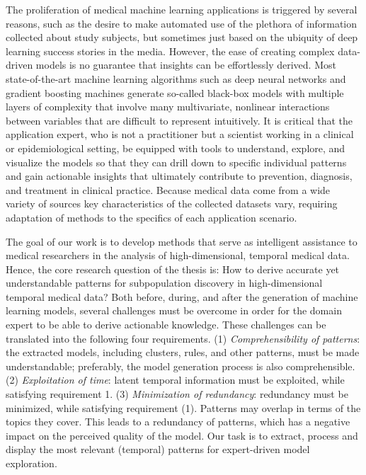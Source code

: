 \documentclass[
  oneside]{book}
\begin{document}
The proliferation of medical machine learning applications is triggered by several reasons, such as the desire to make automated use of the plethora of information collected about study subjects, but sometimes just based on the ubiquity of deep learning success stories in the media.
However, the ease of creating complex data-driven models is no guarantee that insights can be effortlessly derived.
Most state-of-the-art machine learning algorithms such as deep neural networks and gradient boosting machines generate so-called black-box models with multiple layers of complexity that involve many multivariate, nonlinear interactions between variables that are difficult to represent intuitively.
It is critical that the application expert, who is not a practitioner but a scientist working in a clinical or epidemiological setting, be equipped with tools to understand, explore, and visualize the models so that they can drill down to specific individual patterns and gain actionable insights that ultimately contribute to prevention, diagnosis, and treatment in clinical practice.
Because medical data come from a wide variety of sources key characteristics of the collected datasets vary, requiring adaptation of methods to the specifics of each application scenario.

The goal of our work is to develop methods that serve as intelligent assistance to medical researchers in the analysis of high-dimensional, temporal medical data.
Hence, the core research question of the thesis is: How to derive accurate yet understandable patterns for subpopulation discovery in high-dimensional temporal medical data?
Both before, during, and after the generation of machine learning models, several challenges must be overcome in order for the domain expert to be able to derive actionable knowledge.
These challenges can be translated into the following four requirements.
(1) \emph{Comprehensibility of patterns}: the extracted models, including clusters, rules, and other patterns, must be made understandable; preferably, the model generation process is also comprehensible.
(2) \emph{Exploitation of time}: latent temporal information must be exploited, while satisfying requirement 1.
(3) \emph{Minimization of redundancy}: redundancy must be minimized, while satisfying requirement (1).
Patterns may overlap in terms of the topics they cover.
This leads to a redundancy of patterns, which has a negative impact on the perceived quality of the model.
Our task is to extract, process and display the most relevant (temporal) patterns for expert-driven model exploration.
\end{document}
